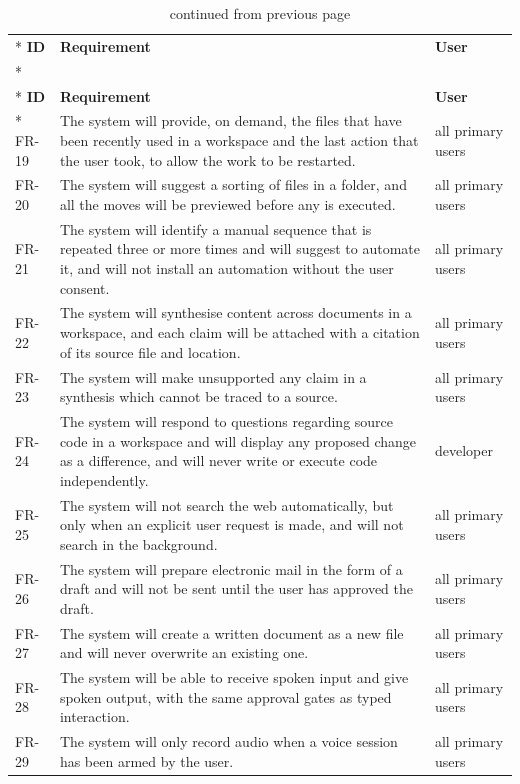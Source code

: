 \documentclass{FastFyp}
\begin{document}
{\small
{}
\begin{longtable}{|p{1.3cm}|p{9.8cm}|p{3.0cm}|}
\caption{Functional requirements: capability features.}\label{tab:fr3}\\*
\hline
\textbf{ID} & \textbf{Requirement} & \textbf{User} \\*
\hline
\endfirsthead
\caption[]{continued from previous page}\\*
\hline
\textbf{ID} & \textbf{Requirement} & \textbf{User} \\*
\hline
\endhead
FR-19 & The system will provide, on demand, the files that have been recently used in a workspace and the last action that the user took, to allow the work to be restarted. & all primary users \\
\hline
FR-20 & The system will suggest a sorting of files in a folder, and all the moves will be previewed before any is executed. & all primary users \\
\hline
FR-21 & The system will identify a manual sequence that is repeated three or more times and will suggest to automate it, and will not install an automation without the user consent. & all primary users \\
\hline
FR-22 & The system will synthesise content across documents in a workspace, and each claim will be attached with a citation of its source file and location. & all primary users \\
\hline
FR-23 & The system will make unsupported any claim in a synthesis which cannot be traced to a source. & all primary users \\
\hline
FR-24 & The system will respond to questions regarding source code in a workspace and will display any proposed change as a difference, and will never write or execute code independently. & developer \\
\hline
FR-25 & The system will not search the web automatically, but only when an explicit user request is made, and will not search in the background. & all primary users \\
\hline
FR-26 & The system will prepare electronic mail in the form of a draft and will not be sent until the user has approved the draft. & all primary users \\
\hline
FR-27 & The system will create a written document as a new file and will never overwrite an existing one. & all primary users \\
\hline
FR-28 & The system will be able to receive spoken input and give spoken output, with the same approval gates as typed interaction. & all primary users \\
\hline
FR-29 & The system will only record audio when a voice session has been armed by the user. & all primary users \\
\hline
\end{longtable}
}
\end{document}
